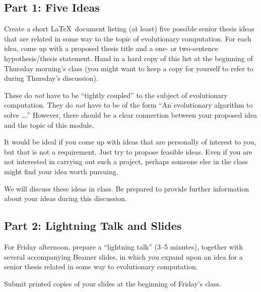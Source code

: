 
\usepackage[compact]{titlesec}




\subsection*{Part 1: Five Ideas}
Create a short \LaTeX\ document
listing (at least) five possible senior thesis ideas that are related in
some way to the topic of evolutionary computation. For each idea, come up
with a proposed thesis title and a one- or two-sentence 
hypothesis/thesis statement. Hand in a hard copy of this list at the beginning
of Thursday morning's class (you might want to keep a copy for yourself to
refer to during Thursday's discussion).

These do {\em not} have to be ``tightly coupled'' to the subject 
of evolutionary computation. They do {\em not} have to be of the form
``An evolutionary algorithm to solve \ldots.'' However, there should be a
clear connection between your proposed idea and the topic of this module.

It would be ideal if you come up with ideas that are personally of
interest to you, but that is not a requirement. Just try to propose
feasible ideas. Even if you are not interested in carrying out such a project,
perhaps someone else in the class might find your idea worth pursuing.

We will discuss these ideas in class. Be prepared to provide further 
information about your ideas during this discussion.

\subsection*{Part 2: Lightning Talk and Slides}
For Friday afternoon, prepare a ``lightning talk'' (3--5 minutes), together
with several accompanying Beamer slides, in which you expand upon an
idea for a senior thesis related in some way to 
evolutionary computation.

Submit printed copies of your slides at the beginning of Friday's class.


